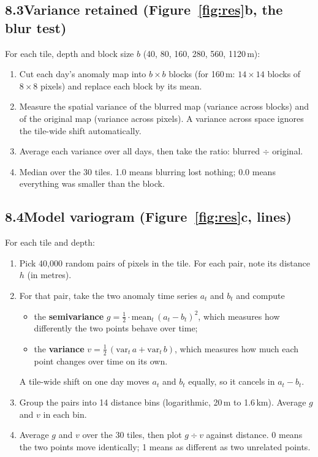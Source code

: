 \documentclass[11pt,a4paper]{article}
\begin{document}
\subsection*{8.3\quad Variance retained (Figure~\ref{fig:res}b, the blur test)}
For each tile, depth and block size $b$ (40, 80, 160, 280, 560, 1120\,m):
\begin{enumerate}
\item Cut each day's anomaly map into $b \times b$ blocks (for 160\,m: $14 \times 14$ blocks of $8 \times 8$ pixels) and
      replace each block by its mean.
\item Measure the spatial variance of the blurred map (variance across blocks) and of the original map
      (variance across pixels). A variance across space ignores the tile-wide shift automatically.
\item Average each variance over all days, then take the ratio: blurred $\div$ original.
\item Median over the 30 tiles. 1.0 means blurring lost nothing; 0.0 means everything was smaller than the block.
\end{enumerate}

\subsection*{8.4\quad Model variogram (Figure~\ref{fig:res}c, lines)}
For each tile and depth:
\begin{enumerate}
\item Pick 40{,}000 random pairs of pixels in the tile. For each pair, note its distance $h$ (in metres).
\item For that pair, take the two anomaly time series $a_t$ and $b_t$ and compute
      \begin{itemize}
      \item the \textbf{semivariance} $g = \frac{1}{2} \cdot \mathrm{mean}_t\,(a_t - b_t)^2$, which measures how differently the two points behave over time;
      \item the \textbf{variance} $v = \frac{1}{2}\,(\mathrm{var}_t\,a + \mathrm{var}_t\,b)$, which measures how much each point changes over time on its own.
      \end{itemize}
      A tile-wide shift on one day moves $a_t$ and $b_t$ equally, so it cancels in $a_t - b_t$.
\item Group the pairs into 14 distance bins (logarithmic, 20\,m to 1.6\,km). Average $g$ and $v$ in each bin.
\item Average $g$ and $v$ over the 30 tiles, then plot $g \div v$ against distance.
      0 means the two points move identically; 1 means as different as two unrelated points.
\end{enumerate}
\end{document}
